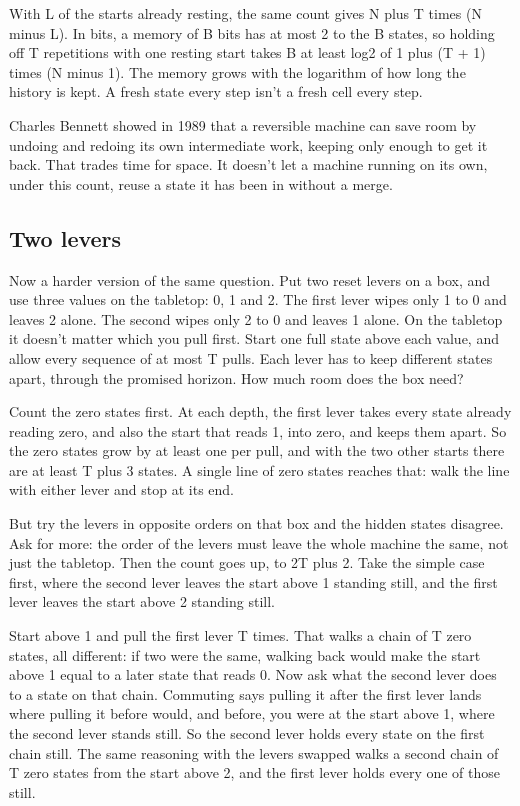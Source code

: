 \documentclass[11pt,twoside]{article}
\theoremstyle{thielethm}
\theoremstyle{thieledef}
\theoremstyle{thieledef}
\theoremstyle{thieledef}
\theoremstyle{thielethm}
\theoremstyle{thieleobs}
\theoremstyle{thielethm}
\begin{document}
With L of the starts already resting, the same count gives N plus T times (N minus L). In bits, a memory of B bits has at most 2 to the B states, so holding off T repetitions with one resting start takes B at least log2 of 1 plus (T + 1) times (N minus 1). The memory grows with the logarithm of how long the history is kept. A fresh state every step isn't a fresh cell every step.

Charles Bennett showed in 1989 that a reversible machine can save room by undoing and redoing its own intermediate work, keeping only enough to get it back. That trades time for space. It doesn't let a machine running on its own, under this count, reuse a state it has been in without a merge.

\subsection{Two levers}

Now a harder version of the same question. Put two reset levers on a box, and use three values on the tabletop: 0, 1 and 2. The first lever wipes only 1 to 0 and leaves 2 alone. The second wipes only 2 to 0 and leaves 1 alone. On the tabletop it doesn't matter which you pull first. Start one full state above each value, and allow every sequence of at most T pulls. Each lever has to keep different states apart, through the promised horizon. How much room does the box need?

Count the zero states first. At each depth, the first lever takes every state already reading zero, and also the start that reads 1, into zero, and keeps them apart. So the zero states grow by at least one per pull, and with the two other starts there are at least T plus 3 states. A single line of zero states reaches that: walk the line with either lever and stop at its end.

But try the levers in opposite orders on that box and the hidden states disagree. Ask for more: the order of the levers must leave the whole machine the same, not just the tabletop. Then the count goes up, to 2T plus 2. Take the simple case first, where the second lever leaves the start above 1 standing still, and the first lever leaves the start above 2 standing still.

Start above 1 and pull the first lever T times. That walks a chain of T zero states, all different: if two were the same, walking back would make the start above 1 equal to a later state that reads 0. Now ask what the second lever does to a state on that chain. Commuting says pulling it after the first lever lands where pulling it before would, and before, you were at the start above 1, where the second lever stands still. So the second lever holds every state on the first chain still. The same reasoning with the levers swapped walks a second chain of T zero states from the start above 2, and the first lever holds every one of those still.
\end{document}
